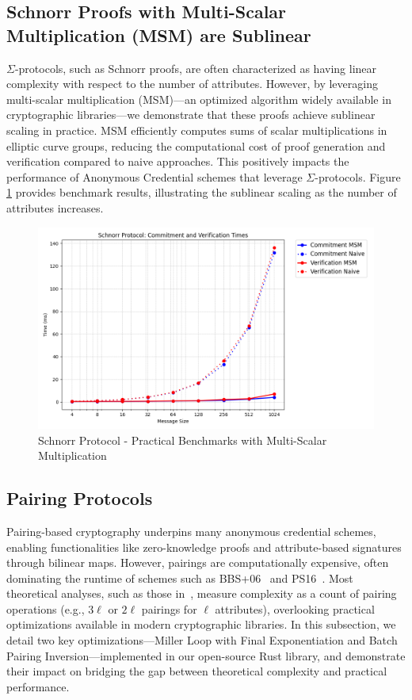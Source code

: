 \subsection{Schnorr Proofs with Multi-Scalar Multiplication (MSM) are Sublinear}\label{sigma-protocol-analysis}

$\Sigma$-protocols, such as Schnorr proofs, are often characterized as having linear complexity with respect to the number of attributes. However, by leveraging multi-scalar multiplication (MSM)—an optimized algorithm widely available in cryptographic libraries—we demonstrate that these proofs achieve sublinear scaling in practice. MSM efficiently computes sums of scalar multiplications in elliptic curve groups, reducing the computational cost of proof generation and verification compared to naive approaches. This positively impacts the performance of Anonymous Credential schemes that leverage $\Sigma$-protocols. Figure \ref{fig:schnorr-benchmarks} provides benchmark results, illustrating the sublinear scaling as the number of attributes increases.

\begin{figure}[!htb]
    \centering
    \includegraphics[width=0.75\linewidth]{schnorr_msm_no_msm.png}
    \caption{Schnorr Protocol - Practical Benchmarks with Multi-Scalar Multiplication}
    \label{fig:schnorr-benchmarks}
\end{figure}





\subsection{Pairing Protocols}

Pairing-based cryptography underpins many anonymous credential schemes, enabling functionalities like zero-knowledge proofs and attribute-based signatures through bilinear maps. However, pairings are computationally expensive, often dominating the runtime of schemes such as BBS+06~\cite{hutchison_constant-size_2006} and PS16~\cite{sako_short_2016}. Most theoretical analyses, such as those in~\cite{sako_short_2016}, measure complexity as a count of pairing operations (e.g., $3\ell$ or $2\ell$ pairings for $\ell$ attributes), overlooking practical optimizations available in modern cryptographic libraries. In this subsection, we detail two key optimizations—Miller Loop with Final Exponentiation and Batch Pairing Inversion—implemented in our open-source Rust library, and demonstrate their impact on bridging the gap between theoretical complexity and practical performance.

